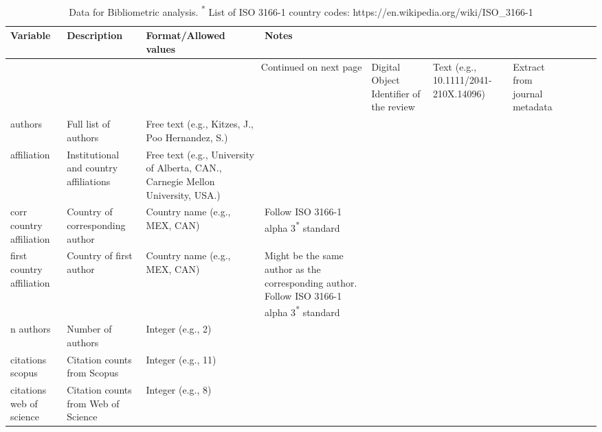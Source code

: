 \documentclass{article}
\begin{document}
\begin{longtable}{p{1.5cm}|p{3cm}|p{3cm}|p{3cm}}
\caption{Data for Bibliometric analysis. \textsuperscript{*} List of ISO 3166-1 country codes: https://en.wikipedia.org/wiki/ISO\_3166-1}\\
        \hline
         \textbf{Variable} & \textbf{Description} & \textbf{Format/Allowed values} & \textbf{Notes}\\
         \hline

         \endhead

         \multicolumn{4}{r}{Continued on next page}
         \endfoot

         \multicolumn{4}{r}{End of Table}
         \endlastfoot
         
         doi & Digital Object Identifier of the review & Text (e.g., 10.1111/2041-210X.14096) & Extract from journal metadata\\
        \hline
         authors & Full list of authors & Free text (e.g., Kitzes, J., Poo Hernandez, S.) & \\
        \hline
         affiliation & Institutional and country affiliations & Free text  (e.g., University of Alberta, CAN., Carnegie Mellon University, USA.) & \\
        \hline
         corr country affiliation & Country of corresponding author & Country name (e.g., MEX, CAN) & Follow ISO 3166-1 alpha 3\textsuperscript{*} standard\\
        \hline
         first country affiliation & Country of first author & Country name (e.g., MEX, CAN) & Might be the same author as the corresponding author. Follow ISO 3166-1 alpha 3\textsuperscript{*} standard \\
        \hline
         n authors & Number of authors & Integer (e.g., 2) & \\
        \hline
         citations scopus & Citation counts from Scopus & Integer (e.g., 11) & \\
        \hline
         citations web of science & Citation counts from Web of Science & Integer (e.g., 8) & 
\label{tab:critApp}
\end{longtable}
\end{document}
